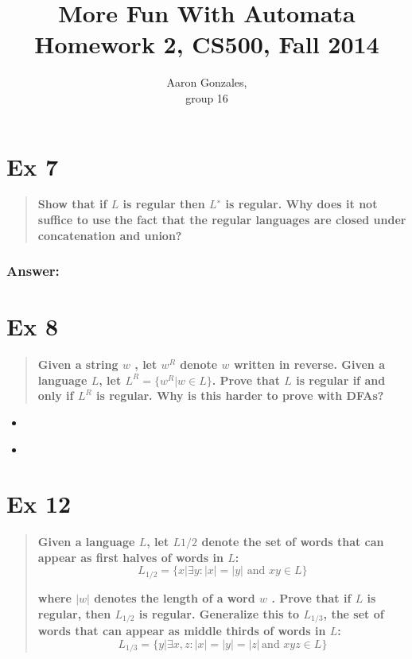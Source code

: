 \documentclass[titlepage]{article}\usepackage[]{graphicx}\usepackage[]{color}
\begin{document}
\title{More Fun With Automata \\ Homework 2, CS500, Fall 2014}
\author{Aaron Gonzales, \\ group 16}
\maketitle


\section*{Ex 7}
\begin{quote}
  \textbf{Show that if $L$ is regular then $L^∗$ is regular. Why does it not suffice
  to use the fact that the regular languages are closed under concatenation and
  union?}
\end{quote}

\subsubsection*{Answer:}



\section*{Ex 8}
\begin{quote}
  \textbf{Given a string $w$ , let $w^R$ denote $w$ written in reverse.
    Given a language $L$, let $L^R = \{w^R | w \in L \}$. Prove that $L$ is regular if and
    only if $L^R$ is regular. Why is this harder to prove with DFAs?}
\end{quote}

\begin{itemize}
  \item \textbf{}
  \item \textbf{ }
\end{itemize}



\section*{Ex 12}
\begin{quote}
    \textbf{Given a language $L$, let $L1/2$ denote the set of words that can appear
    as first halves of words in $L$:}
    \[ L_{1/2} = \{ x | \exists y : |x| = |y| \text{ and } x y \in L \} \]
    
  \textbf{where $|w |$ denotes the length of a word $w$ . Prove that if $L$ is
      regular, then $L_{1/2}$ is regular. Generalize this to $L_{1/3}$, the set of
      words that can appear as middle thirds of words in $L$:}
  \[ L_{1/3} = \{ y | \exists x,z : |x| = |y| = |z|\,  \text{and } x y z \in L \} \]
  
\end{quote}
\end{document}
